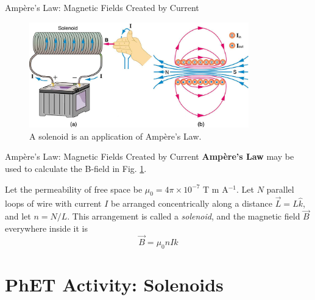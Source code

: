 \documentclass{beamer}
\begin{document}
\begin{frame}{Amp\`{e}re's Law: Magnetic Fields Created by Current}
\begin{figure}
\centering
\includegraphics[width=0.85\textwidth]{figures/solenoid.jpeg}
\caption{\label{fig:solenoid1} A solenoid is an application of Amp\`{e}re's Law.}
\end{figure}
\end{frame}

\begin{frame}{Amp\`{e}re's Law: Magnetic Fields Created by Current}
\textbf{\alert{Amp\`{e}re's Law}} may be used to calculate the B-field in Fig. \ref{fig:solenoid1}.
\begin{tcolorbox}[colback=white,colframe=gray,title=Magnetic Field of a Solenoid]
\alert{Let the permeability of free space be $\mu_0 = 4\pi \times 10^{-7}$ T m A$^{-1}$.  Let $N$ parallel loops of wire with current $I$ be arranged concentrically along a distance $\vec{L} = L\hat{k}$, and let $n = N/L$.  This arrangement is called a \textit{solenoid}, and the magnetic field $\vec{B}$ everywhere inside it is
\begin{equation}
\vec{B} = \mu_0 n I \hat{k} \label{eq:solenoid}
\end{equation}}
\end{tcolorbox}
\end{frame}

\section{PhET Activity: Solenoids}
\end{document}
